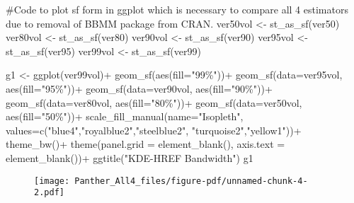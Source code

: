 \documentclass[
  letterpaper,
]{book}
\newenvironment{Shaded}{\begin{snugshade}}{\end{snugshade}}
\newcommand{\AttributeTok}[1]{\textcolor[rgb]{0.40,0.45,0.13}{#1}}
\newcommand{\CommentTok}[1]{\textcolor[rgb]{0.37,0.37,0.37}{#1}}
\newcommand{\FunctionTok}[1]{\textcolor[rgb]{0.28,0.35,0.67}{#1}}
\newcommand{\NormalTok}[1]{\textcolor[rgb]{0.00,0.23,0.31}{#1}}
\newcommand{\OtherTok}[1]{\textcolor[rgb]{0.00,0.23,0.31}{#1}}
\newcommand{\SpecialCharTok}[1]{\textcolor[rgb]{0.37,0.37,0.37}{#1}}
\newcommand{\StringTok}[1]{\textcolor[rgb]{0.13,0.47,0.30}{#1}}
\begin{document}
\begin{Shaded}
\begin{Highlighting}[]
\CommentTok{\#Code to plot sf form in ggplot which is necessary to compare all 4 estimators due to removal of BBMM package from CRAN.}
\NormalTok{ver50vol }\OtherTok{\textless{}{-}} \FunctionTok{st\_as\_sf}\NormalTok{(ver50)}
\NormalTok{ver80vol }\OtherTok{\textless{}{-}} \FunctionTok{st\_as\_sf}\NormalTok{(ver80)}
\NormalTok{ver90vol }\OtherTok{\textless{}{-}} \FunctionTok{st\_as\_sf}\NormalTok{(ver90)}
\NormalTok{ver95vol }\OtherTok{\textless{}{-}} \FunctionTok{st\_as\_sf}\NormalTok{(ver95)}
\NormalTok{ver99vol }\OtherTok{\textless{}{-}} \FunctionTok{st\_as\_sf}\NormalTok{(ver99)}

\NormalTok{g1 }\OtherTok{\textless{}{-}} \FunctionTok{ggplot}\NormalTok{(ver99vol)}\SpecialCharTok{+}
  \FunctionTok{geom\_sf}\NormalTok{(}\FunctionTok{aes}\NormalTok{(}\AttributeTok{fill=}\StringTok{"99\%"}\NormalTok{))}\SpecialCharTok{+}
  \FunctionTok{geom\_sf}\NormalTok{(}\AttributeTok{data=}\NormalTok{ver95vol, }\FunctionTok{aes}\NormalTok{(}\AttributeTok{fill=}\StringTok{"95\%"}\NormalTok{))}\SpecialCharTok{+} 
  \FunctionTok{geom\_sf}\NormalTok{(}\AttributeTok{data=}\NormalTok{ver90vol, }\FunctionTok{aes}\NormalTok{(}\AttributeTok{fill=}\StringTok{"90\%"}\NormalTok{))}\SpecialCharTok{+}
  \FunctionTok{geom\_sf}\NormalTok{(}\AttributeTok{data=}\NormalTok{ver80vol, }\FunctionTok{aes}\NormalTok{(}\AttributeTok{fill=}\StringTok{"80\%"}\NormalTok{))}\SpecialCharTok{+}
  \FunctionTok{geom\_sf}\NormalTok{(}\AttributeTok{data=}\NormalTok{ver50vol, }\FunctionTok{aes}\NormalTok{(}\AttributeTok{fill=}\StringTok{"50\%"}\NormalTok{))}\SpecialCharTok{+}
  \FunctionTok{scale\_fill\_manual}\NormalTok{(}\AttributeTok{name=}\StringTok{"Isopleth"}\NormalTok{, }\AttributeTok{values=}\FunctionTok{c}\NormalTok{(}\StringTok{"blue4"}\NormalTok{,}\StringTok{"royalblue2"}\NormalTok{,}\StringTok{"steelblue2"}\NormalTok{, }\StringTok{"turquoise2"}\NormalTok{,}\StringTok{"yellow1"}\NormalTok{))}\SpecialCharTok{+}
  \FunctionTok{theme\_bw}\NormalTok{()}\SpecialCharTok{+}
  \FunctionTok{theme}\NormalTok{(}\AttributeTok{panel.grid =} \FunctionTok{element\_blank}\NormalTok{(), }\AttributeTok{axis.text =} \FunctionTok{element\_blank}\NormalTok{())}\SpecialCharTok{+}
  \FunctionTok{ggtitle}\NormalTok{(}\StringTok{"KDE{-}HREF Bandwidth"}\NormalTok{)}
\NormalTok{g1}
\end{Highlighting}
\end{Shaded}

\begin{figure}[H]

{\centering \texttt{[image: Panther\_All4\_files/figure-pdf/unnamed-chunk-4-2.pdf]}

}

\end{figure}
\end{document}
